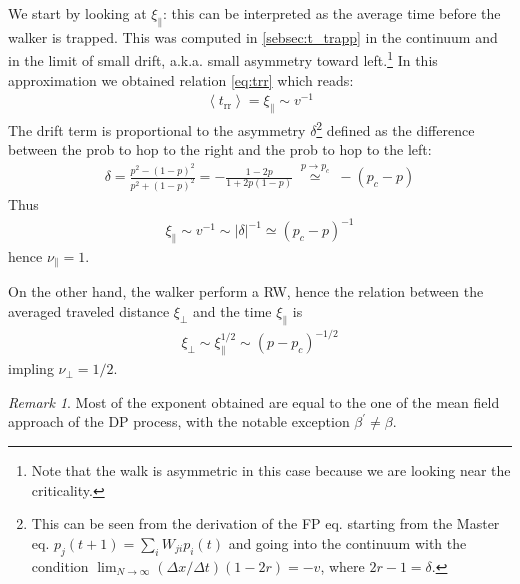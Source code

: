 \documentclass[4apaper,11pt,fleqn]{article}
\theoremstyle{remark}
\newtheorem*{rem}{Remark}
\theoremstyle{definition}
\begin{document}
We start by looking at $\xi_{\parallel}$: this can be interpreted as the average time before the walker is trapped. This was computed in \ref{sebsec:t_trapp} in the continuum and in the limit of small drift, a.k.a. small asymmetry toward left.\footnote{Note that the walk is asymmetric in this case because we are looking near the criticality.}
In this approximation we obtained relation \eqref{eq:trr} which reads:
\begin{align*}
  \left\langle t_{\mathrm{rr}}\right\rangle = \xi_{\parallel} \sim v^{-1}
\end{align*}
The drift term is proportional to the asymmetry $\delta$\;\footnote{This can be seen from the derivation of the FP eq. starting from the Master eq. $p_j(t+1)=\sum_{i} W_{ji}p_i(t)$ and going into the continuum with the condition $\lim_{N\rightarrow \infty} (\Delta x/\Delta t) (1 - 2r) = -v$, where $2r-1 = \delta$.} defined as the difference between the prob to hop to the right and the prob to hop to the left:
\begin{align*}
  \delta=\frac{p^{2}-(1-p)^{2}}{p^{2}+(1-p)^{2}}=-\frac{1-2 p}{1+2 p(1-p)} \;\overset{p \rightarrow p_c}{\simeq}\; -\left(p_{c}-p\right)
\end{align*}
Thus
\begin{align*}
  \xi_{\parallel} \sim v^{-1} \sim |\delta|^{-1} \simeq (p_c-p)^{-1}
\end{align*}
hence $\nu_\parallel =1$.

On the other hand, the walker perform a RW, hence the relation between the averaged traveled distance $\xi_{\perp}$ and the time $\xi_{\parallel}$ is
\begin{align*}
  \xi_{\perp} \sim \xi_{\parallel}^{1/2} \sim (p-p_c)^{-1/2}
\end{align*}
impling $\nu_{\perp}=1/2$.

\begin{rem}
  Most of the exponent obtained are equal to the one of the mean field approach of the DP process, with the notable exception $\beta^\prime \neq \beta$.
\end{rem}
\end{document}
